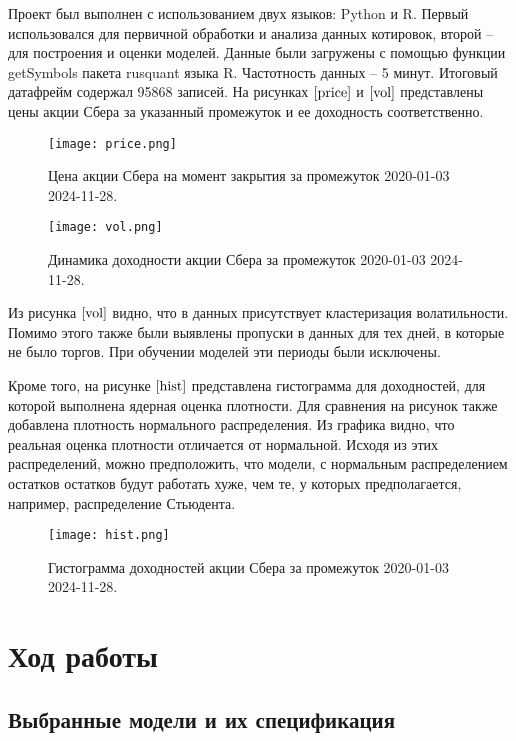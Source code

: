 \documentclass[]{article}
\begin{document}
Проект был выполнен с использованием двух языков: Python и R. Первый использовался для первичной обработки и анализа данных котировок, второй -- для построения и оценки моделей.
Данные были загружены с помощью функции getSymbols пакета rusquant языка R. Частотность данных -- 5 минут.
Итоговый датафрейм содержал 95868 записей. На рисунках $\ref{price}$ и $\ref{vol}$ представлены цены акции Сбера за указанный промежуток и ее доходность соответственно.

\begin{figure}[h!]
	\centering
	\texttt{[image: price.png]}
	\caption{Цена акции Сбера на момент закрытия за промежуток 2020-01-03 2024-11-28.}
	\label{price}
\end{figure}

\begin{figure}[h!]
	\centering
	\texttt{[image: vol.png]}
	\caption{Динамика доходности акции Сбера за промежуток 2020-01-03 2024-11-28.}
	\label{vol}
\end{figure}

Из рисунка $\ref{vol}$ видно, что в данных присутствует кластеризация волатильности. Помимо этого также были выявлены пропуски в данных для тех дней, в которые не было торгов. При обучении моделей эти периоды были исключены.

Кроме того, на рисунке $\ref{hist}$ представлена гистограмма для доходностей, для которой выполнена ядерная оценка плотности. Для сравнения на рисунок также добавлена плотность нормального распределения. Из графика видно, что реальная оценка плотности отличается от нормальной. Исходя из этих распределений, можно предположить, что модели, с нормальным распределением остатков остатков будут работать хуже, чем те, у которых предполагается, например, распределение Стьюдента. 

\begin{figure}[h!]
	\centering
	\texttt{[image: hist.png]}
	\caption{Гистограмма доходностей акции Сбера за промежуток 2020-01-03 2024-11-28.}
	\label{hist}
\end{figure}




\section{Ход работы}
\subsection{Выбранные модели и их спецификация}
\end{document}
